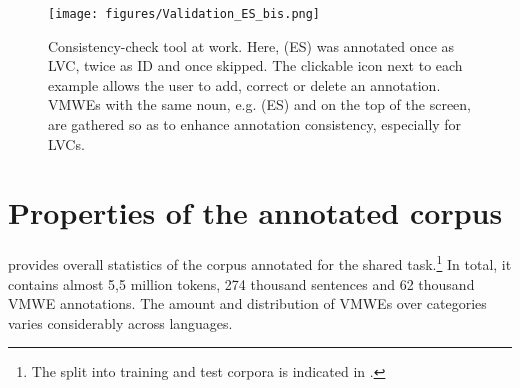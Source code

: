 \documentclass[output=paper,
modfonts,
]{langscibook}
\begin{document}
\begin{figure}[ht]
\texttt{[image: figures/Validation\_ES\_bis.png]}%
\caption{
Consistency-check tool at work. Here, (ES)  was annotated once as LVC, twice as ID and once skipped. The clickable icon next to each example allows the user to add, correct or delete an annotation. VMWEs with the same noun, e.g. (ES)  and  on the top of the screen, are gathered so as to enhance annotation consistency, especially for LVCs.
}
\label{fig:validationES}
\end{figure}

\section{Properties of the annotated corpus}
\label{sec:corpora}
%
 provides overall statistics of the corpus annotated for the shared task.\footnote{
The split into training and test corpora is indicated in \citet{MWEWorkshop}.} In total, it contains almost 5,5 million tokens, 274 thousand sentences and 62 thousand VMWE annotations. 
The amount and distribution of VMWEs over categories varies considerably across languages.
\end{document}
